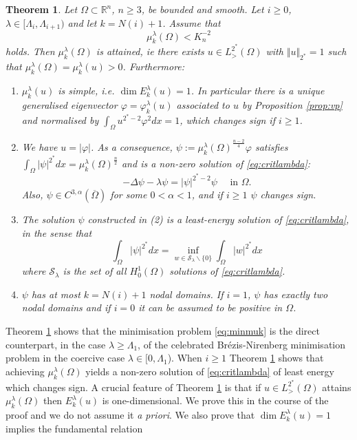\documentclass[10pt]{amsart}
\numberwithin{equation}{section}
\newcommand{\R}{\mathbb{R}}
\newcommand{\vp}{\varphi}
\newcommand{\Om}{\Omega}
\newcommand{\mkl}{\mu_{k}^{\lambda}}
\theoremstyle{plain}
\newtheorem{theo}{Theorem}[section]%
\theoremstyle{remark}
\begin{document}
\begin{theo} \label{prop:minmkl1}
Let $\Om \subset \R^n$, $n \ge 3$, be bounded and smooth. Let $i \ge 0$, $\lambda \in [\Lambda_i, \Lambda_{i+1})$ and let $k = N(i)+1 $. Assume that 
 \begin{equation} \label{eq:test1}
\mkl(\Om) < K_n^{-2} 
\end{equation}
holds. Then $\mkl(\Om)$ is attained, ie there exists $u \in L^{2^*}_{>}(\Om) $ with  $\Vert u \Vert_{2^*} = 1$ such that $\mkl(\Om) = \mkl(u) >0$. Furthermore:
\begin{enumerate}
\item $\mkl(u)$ is simple, i.e. $\dim E_{k}^{\lambda}(u)= 1$. In particular there is a unique generalised eigenvector $\vp = \vp_k^{\lambda}(u)$ associated to $u$ by Proposition \ref{prop:vp} and normalised by $\int_{\Om} u^{2^*-2} \vp^2dx = 1$, which changes sign if $i \ge 1$.
\item  We have $u = |\vp|$. As a consequence, $\psi:= {\mu_{k}^{\lambda}(\Om)}^{\frac{n-2}{4}} \vp$ satisfies $\int_{\Om} |\psi|^{2^*}dx = \mu_{k}^{\lambda}(\Om)^{\frac{n}{2}}$ and is a non-zero solution of \eqref{eq:critlambda}:
$$ - \Delta \psi - \lambda \psi =  |\psi|^{2^*-2}\psi   \quad \text{ in } \Om . $$
Also, $\psi \in  C^{3,\alpha}(\overline{\Om})$ for some $0< \alpha < 1$, and if $i \ge 1$ $\psi$ changes sign.
\item The solution $\psi$ constructed in (2) is a least-energy solution of \eqref{eq:critlambda}, in the sense that 
$$ \int_{\Om} |\psi|^{2^*} dx = \inf_{w \in \mathcal{S}_\lambda\backslash \{0\}}  \int_{\Om} |w|^{2^*} dx $$
where $\mathcal{S}_{\lambda}$ is the set of all $H^1_0(\Om)$ solutions of \eqref{eq:critlambda}. 
\item $\psi$ has at most $k = N(i)+1$ nodal domains. If $i=1$, $\psi$ has exactly two nodal domains and if $i=0$ it can be assumed to be positive in $\Om$. 
\end{enumerate}
\end{theo}
Theorem \ref{prop:minmkl1} shows that the minimisation problem \eqref{eq:minmuk} is the direct counterpart, in the case $\lambda \ge \Lambda_1$, of the celebrated Br\'ezis-Nirenberg \cite{BN} minimisation problem  in the coercive case $\lambda \in [0, \Lambda_1$). When $i \ge 1$ Theorem \ref{prop:minmkl1} shows that achieving $\mkl(\Omega)$ yields a non-zero solution of \eqref{eq:critlambda} of least energy which changes sign. A crucial feature of Theorem \ref{prop:minmkl1} is that if $u \in L^{2^*}_{>}(\Om)$ attains $\mkl(\Omega)$ then $E_{k}^{\lambda}(u)$ is one-dimensional. We prove this in the course of the proof and we do not assume it \emph{a priori}. We also prove that $\dim E_k^{\lambda}(u) = 1$ implies the fundamental relation 
\end{document}
